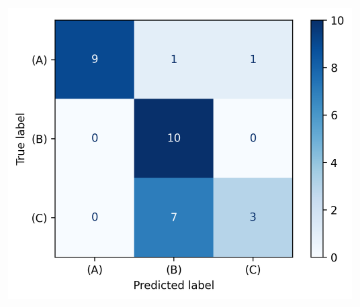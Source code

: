 \documentclass[energies,article,submit,pdftex,moreauthors]{Definitions/mdpi}
\begin{document}
\begin{figure}[t!]
\begin{subfigure}[t]{0.3\textwidth}
        \caption{}
    \end{subfigure}
    ~ 
    \begin{subfigure}[t]{0.3\textwidth}
        \centering
        \includegraphics[width=\linewidth]{images/confusion_matrix_multiclass_2}
        \caption{}
    \end{subfigure}


\end{figure}
\end{document}
